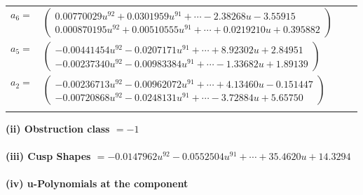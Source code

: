 \documentclass[1p]{elsarticle_modified}
\theoremstyle{definition}
\begin{document}
\begin{tabular}{m{7pt} m{180pt} m{7pt} m{180pt} }
\flushright $a_{6}=$&$\begin{pmatrix}0.00770029 u^{92}+0.0301959 u^{91}+\cdots-2.38268 u-3.55915\\0.000870195 u^{92}+0.00510555 u^{91}+\cdots+0.0219210 u+0.395882\end{pmatrix}$ \\
\flushright $a_{5}=$&$\begin{pmatrix}-0.00441454 u^{92}-0.0207171 u^{91}+\cdots+8.92302 u+2.84951\\-0.00237340 u^{92}-0.00983384 u^{91}+\cdots-1.33682 u+1.89139\end{pmatrix}$ \\
\flushright $a_{2}=$&$\begin{pmatrix}-0.00236713 u^{92}-0.00962072 u^{91}+\cdots+4.13460 u-0.151447\\-0.00720868 u^{92}-0.0248131 u^{91}+\cdots-3.72884 u+5.65750\end{pmatrix}$\\&\end{tabular}
\flushleft \textbf{(ii) Obstruction class $= -1$}\\~\\
\flushleft \textbf{(iii) Cusp Shapes $= -0.0147962 u^{92}-0.0552504 u^{91}+\cdots+35.4620 u+14.3294$}\\~\\
\newpage\renewcommand{\arraystretch}{1}
\flushleft \textbf{(iv) u-Polynomials at the component}\newline \\
\end{document}
